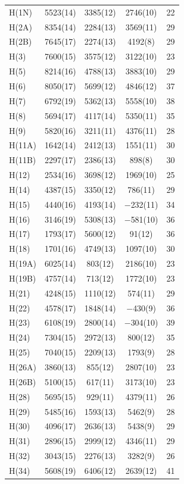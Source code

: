 \begin{center}
\tablelasttail{\bottomrule}
 {\footnotesize \singlespacing
\begin{supertabular}{lcccc}
H(1N)&5523(14)&3385(12)&2746(10)&22\\
H(2A)&8354(14)&2284(13)&3569(11)&29\\
H(2B)&7645(17)&2274(13)&4192(8)&29\\
H(3)&7600(15)&3575(12)&3122(10)&23\\
H(5)&8214(16)&4788(13)&3883(10)&29\\
H(6)&8050(17)&5699(12)&4846(12)&37\\
H(7)&6792(19)&5362(13)&5558(10)&38\\
H(8)&5694(17)&4117(14)&5350(11)&35\\
H(9)&5820(16)&3211(11)&4376(11)&28\\
H(11A)&1642(14)&2412(13)&1551(11)&30\\
H(11B)&2297(17)&2386(13)&898(8)&30\\
H(12)&2534(16)&3698(12)&1969(10)&25\\
H(14)&4387(15)&3350(12)&786(11)&29\\
H(15)&4440(16)&4193(14)&$-$232(11)&34\\
H(16)&3146(19)&5308(13)&$-$581(10)&36\\
H(17)&1793(17)&5600(12)&91(12)&36\\
H(18)&1701(16)&4749(13)&1097(10)&30\\
H(19A)&6025(14)&803(12)&2186(10)&23\\
H(19B)&4757(14)&713(12)&1772(10)&23\\
H(21)&4248(15)&1110(12)&574(11)&29\\
H(22)&4578(17)&1848(14)&$-$430(9)&36\\
H(23)&6108(19)&2800(14)&$-$304(10)&39\\
H(24)&7304(15)&2972(13)&800(12)&35\\
H(25)&7040(15)&2209(13)&1793(9)&28\\
H(26A)&3860(13)&855(12)&2807(10)&23\\
H(26B)&5100(15)&617(11)&3173(10)&23\\
H(28)&5695(15)&929(11)&4379(11)&26\\
H(29)&5485(16)&1593(13)&5462(9)&28\\
H(30)&4096(17)&2636(13)&5438(9)&29\\
H(31)&2896(15)&2999(12)&4346(11)&29\\
H(32)&3043(15)&2276(13)&3282(9)&26\\
H(34)&5608(19)&6406(12)&2639(12)&41\\
\end{supertabular}
}
\end{center}

